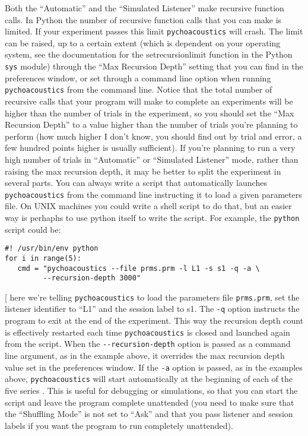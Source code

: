 Both the ``Automatic'' and the ``Simulated Listener'' make recursive function calls. In Python the number of recursive function
calls that you can make is limited. If your experiment passes this limit \texttt{pychoacoustics} will crash. The limit can be
raised, up to a certain extent (which is dependent on your operating system, see the documentation for the setrecursionlimit function in the Python \texttt{sys} module) through the ``Max Recursion Depth'' setting that you can
find in the preferences window, or set through a command line option when running \texttt{pychoacoustics} from the command line.
Notice that the total number of recursive calls that your program will make to complete an experiments will be higher than the number of
trials in the experiment, so you should set the ``Max Recursion Depth'' to a value higher than the number of trials you're planning
to perform (how much higher I don't know, you should find out by trial and error, a few hundred points higher is usually sufficient).
If you're planning to run a very high number of trials in ``Automatic'' or ``Simulated Listener'' mode, rather than raising 
the max recursion depth, it may be better to split the experiment in several parts. You can always write a script that automatically
launches \texttt{pychoacoustics} from the command line instructing it to load a given parameters file. On UNIX machines you could write a shell script to do that, 
but an easier way is perhaphs to use python itself to write the script. For example, the \texttt{python} script could be:
\begin{lstlisting}
#! /usr/bin/env python
for i in range(5):
   cmd = "pychoacoustics --file prms.prm -l L1 -s s1 -q -a \
         --recursion-depth 3000" 
\end{lstlisting}[
here we're telling \texttt{pychoacoustics} to load the parameters file \texttt{prms.prm}, set the listener identifier to ``L1'' and the session label to s1. 
The \texttt{-q} option instructs the program to exit at the end of the experiment. 
This way the recursion depth count is effectively restarted each time \texttt{pychoacoustics} is closed and launched again from the script. 
When the \verb+--recursion-depth+ option is passed as a command line argument, as in the example above, it overrides 
the max recursion depth value set in the preferences window. If the \verb+-a+ option is passed, as in the examples above, \texttt{pychoacoustics} will start
automatically at the beginning of each of the five series . This is useful for debugging or simulations, so that you can start the script and
leave the program complete unattended (you need to make sure that the ``Shuffling Mode'' is not set to ``Ask'' and that you pass listener
and session labels if you want the program to run completely unattended). 


